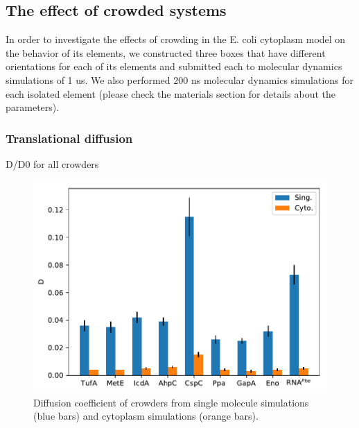 \documentclass[journal=jacsat,manuscript=article]{achemso}
\begin{document}
\subsection{The effect of crowded systems}

In order to investigate the effects of crowding in the E. coli cytoplasm model on the behavior of its elements, we constructed three boxes that have different orientations for each of its elements and submitted each to molecular dynamics simulations of 1 us. We also performed 200 ns molecular dynamics simulations for each isolated element (please check the materials section for details about the parameters).

\subsubsection{Translational diffusion}
D/D0 for all crowders

\begin{figure}
\includegraphics[scale=0.6]{msd.pdf}
\caption{Diffusion coefficient of crowders from single molecule simulations (blue bars) and cytoplasm simulations (orange bars).}
\end{figure}
\end{document}
